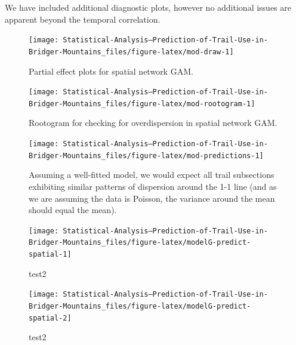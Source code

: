 \documentclass[
]{book}
\begin{document}
We have included additional diagnostic plots, however no additional issues are apparent beyond the temporal correlation.

\begin{figure}

{\centering \texttt{[image: Statistical-Analysis--Prediction-of-Trail-Use-in-Bridger-Mountains\_files/figure-latex/mod-draw-1]} 

}

\caption{Partial effect plots for spatial network GAM.}\label{fig:mod-draw}
\end{figure}

\begin{figure}

{\centering \texttt{[image: Statistical-Analysis--Prediction-of-Trail-Use-in-Bridger-Mountains\_files/figure-latex/mod-rootogram-1]} 

}

\caption{Rootogram for checking for overdispersion in spatial network GAM.}\label{fig:mod-rootogram}
\end{figure}

\begin{figure}

{\centering \texttt{[image: Statistical-Analysis--Prediction-of-Trail-Use-in-Bridger-Mountains\_files/figure-latex/mod-predictions-1]} 

}

\caption{Assuming a well-fitted model, we would expect all trail subsections exhibiting similar patterns of dispersion around the 1-1 line (and as we are assuming the data is Poisson, the variance around the mean should equal the mean).}\label{fig:mod-predictions}
\end{figure}

\begin{figure}

{\centering \texttt{[image: Statistical-Analysis--Prediction-of-Trail-Use-in-Bridger-Mountains\_files/figure-latex/modelG-predict-spatial-1]} 

}

\caption{test2}\label{fig:modelG-predict-spatial-1}
\end{figure}
\begin{figure}

{\centering \texttt{[image: Statistical-Analysis--Prediction-of-Trail-Use-in-Bridger-Mountains\_files/figure-latex/modelG-predict-spatial-2]} 

}

\caption{test2}\label{fig:modelG-predict-spatial-2}
\end{figure}
\end{document}
